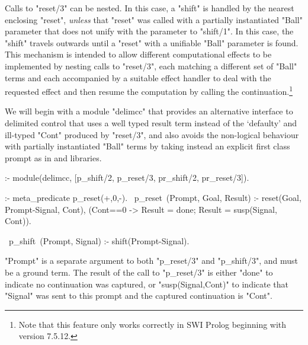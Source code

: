 Calls to "reset/3" can be nested.  In this case, a "shift" is handled by the nearest
enclosing "reset", \emph{unless} that "reset" was called with a partially instantiated "Ball" parameter
that does not unify with the parameter to "shift/1". In this case, the "shift" travels outwards
until a "reset" with a unifiable "Ball" parameter is found. This mechanism is intended to allow different
computational effects to be implemented by nesting calls to "reset/3", each matching a different set of
"Ball" terms and each accompanied by a suitable effect handler to deal with the requested effect and then 
resume the computation by calling the continuation.\footnote{Note that this feature only works correctly
in SWI Prolog beginning with version 7.5.12.}

We will begin with a module "delimcc" that provides an alternative interface to delimited control that
uses a well typed result term instead of the `defaulty' and ill-typed "Cont" produced by "reset/3",
and also avoids the non-logical behaviour with partially instantiated "Ball" terms by taking instead
an explicit first class prompt
as in  and  libraries. 
\begin{prolog-framed}[name=delimcc]
  :- module(delimcc, [p_shift/2, p_reset/3, pr_shift/2, pr_reset/3]).

  :- meta_predicate p_reset(+,0,-).
  ~p_reset~(Prompt, Goal, Result) :-
    reset(Goal, Prompt-Signal, Cont),
    (Cont==0 -> Result = done; Result = susp(Signal, Cont)).

  ~p_shift~(Prompt, Signal) :- shift(Prompt-Signal).
\end{prolog-framed}
"Prompt" is a separate argument to both "p_reset/3" and "p_shift/3", and must be a
ground term. The result of the call to "p_reset/3" is either "done" to indicate no continuation
was captured, or "susp(Signal,Cont)" to indicate that "Signal" was sent to this prompt and
the captured continuation is "Cont".

